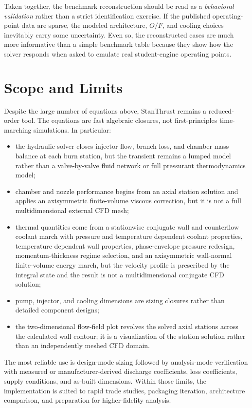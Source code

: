 \documentclass[11pt]{article}
\begin{document}
Taken together, the benchmark reconstruction should be read as a \emph{behavioral validation} rather than a strict identification exercise. If the published operating-point data are sparse, the modeled architecture, $O/F$, and cooling choices inevitably carry some uncertainty. Even so, the reconstructed cases are much more informative than a simple benchmark table because they show how the solver responds when asked to emulate real student-engine operating points.

\section{Scope and Limits}
Despite the large number of equations above, StanThrust remains a reduced-order tool. The equations are fast algebraic closures, not first-principles time-marching simulations. In particular:
\begin{itemize}[leftmargin=5mm]
\item the hydraulic solver closes injector flow, branch loss, and chamber mass balance at each burn station, but the transient remains a lumped model rather than a valve-by-valve fluid network or full pressurant thermodynamics model;
\item chamber and nozzle performance begins from an axial station solution and applies an axisymmetric finite-volume viscous correction, but it is not a full multidimensional external CFD mesh;
\item thermal quantities come from a stationwise conjugate wall and counterflow coolant march with pressure and temperature dependent coolant properties, temperature dependent wall properties, phase-envelope pressure redesign, momentum-thickness regime selection, and an axisymmetric wall-normal finite-volume energy march, but the velocity profile is prescribed by the integral state and the result is not a multidimensional conjugate CFD solution;
\item pump, injector, and cooling dimensions are sizing closures rather than detailed component designs;
\item the two-dimensional flow-field plot revolves the solved axial stations across the calculated wall contour; it is a visualization of the station solution rather than an independently meshed CFD domain.
\end{itemize}

The most reliable use is design-mode sizing followed by analysis-mode verification with measured or manufacturer-derived discharge coefficients, loss coefficients, supply conditions, and as-built dimensions. Within those limits, the implementation is suited to rapid trade studies, packaging iteration, architecture comparison, and preparation for higher-fidelity analysis.
\end{document}
